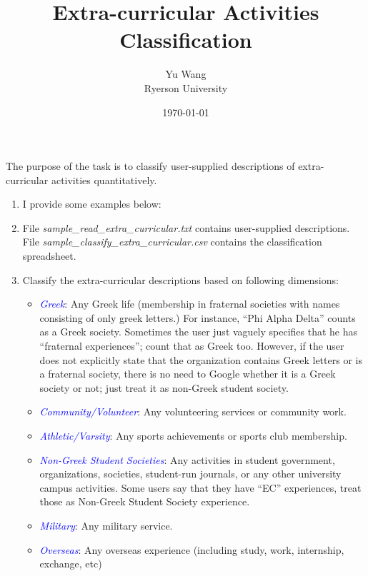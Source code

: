 \documentclass[12pt]{article}
\begin{document}
\title{Extra-curricular Activities Classification} 
  
 \author{Yu Wang\\
 Ryerson University}

\date{\today}
\maketitle

The purpose of the task is to classify user-supplied descriptions of extra-curricular activities quantitatively. 

\begin{enumerate}
\item I provide some examples below:
\item File {\itshape sample\_read\_extra\_curricular.txt} contains user-supplied descriptions. File {\itshape sample\_classify\_extra\_curricular.csv} contains the classification spreadsheet. 
\item Classify the extra-curricular descriptions based on following dimensions:
\begin{itemize}
\item {\itshape\textcolor{blue}{Greek}}: Any Greek life (membership in fraternal societies with names consisting of only greek letters.) For instance, ``Phi Alpha Delta'' counts as a Greek society. Sometimes the user just vaguely specifies that he has ``fraternal experiences''; count that as Greek too. However, if the user does not explicitly state that the organization contains Greek letters or is a fraternal society, there is no need to Google whether it is a Greek society or not; just treat it as non-Greek student society. 
\item {\itshape \textcolor{blue}{Community/Volunteer}}: Any volunteering services or community work.
\item {\itshape \textcolor{blue}{Athletic/Varsity}}: Any sports achievements or sports club membership.
\item {\itshape \textcolor{blue}{Non-Greek Student Societies}}: Any activities in student government, organizations, societies, student-run journals, or any other university campus activities. Some users say that they have ``EC'' experiences, treat those as Non-Greek Student Society experience. 
\item {\itshape \textcolor{blue}{Military}}: Any military service. 
\item {\itshape \textcolor{blue}{Overseas}}: Any overseas experience (including study, work, internship, exchange, etc)

\end{itemize}
\end{enumerate}
\end{document}
